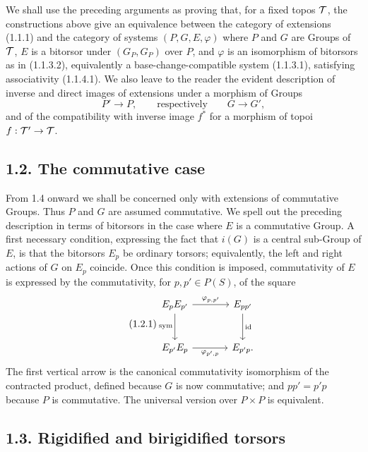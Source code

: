 \documentclass[11pt]{article}
\providecommand{\id}{\operatorname{id}}
\begin{document}
We shall use the preceding arguments as proving that, for a fixed topos \(\mathcal T\), the constructions above give an equivalence between the category of extensions (1.1.1) and the category of systems \((P,G,E,\varphi)\) where \(P\) and \(G\) are Groups of \(\mathcal T\), \(E\) is a bitorsor under \((G_P,G_P)\) over \(P\), and \(\varphi\) is an isomorphism of bitorsors as in (1.1.3.2), equivalently a base-change-compatible system (1.1.3.1), satisfying associativity (1.1.4.1).  We also leave to the reader the evident description of inverse and direct images of extensions under a morphism of Groups
\[
  P'\longrightarrow P,\qquad\text{respectively}\qquad G\longrightarrow G',
\]
and of the compatibility with inverse image \(f^*\) for a morphism of topoi \(f:\mathcal T'\to\mathcal T\).

\subsection*{1.2. The commutative case}

From 1.4 onward we shall be concerned only with extensions of commutative Groups.  Thus \(P\) and \(G\) are assumed commutative.  We spell out the preceding description in terms of bitorsors in the case where \(E\) is a commutative Group.  A first necessary condition, expressing the fact that \(i(G)\) is a central sub-Group of \(E\), is that the bitorsors \(E_p\) be ordinary torsors; equivalently, the left and right actions of \(G\) on \(E_p\) coincide.  Once this condition is imposed, commutativity of \(E\) is expressed by the commutativity, for \(p,p'\in P(S)\), of the square
\begin{equation}\tag{1.2.1}
\begin{tikzcd}[column sep=large,row sep=large]
E_pE_{p'}\arrow[r,"\varphi_{p,p'}"]\arrow[d,"\sym"']&
E_{pp'}\arrow[d,"\id"]\\
E_{p'}E_p\arrow[r,"\varphi_{p',p}"']&
E_{p'p}.
\end{tikzcd}
\end{equation}
The first vertical arrow is the canonical commutativity isomorphism of the contracted product, defined because \(G\) is now commutative; and \(pp'=p'p\) because \(P\) is commutative.  The universal version over \(P\times P\) is equivalent.

\subsection*{1.3. Rigidified and birigidified torsors}
\end{document}

